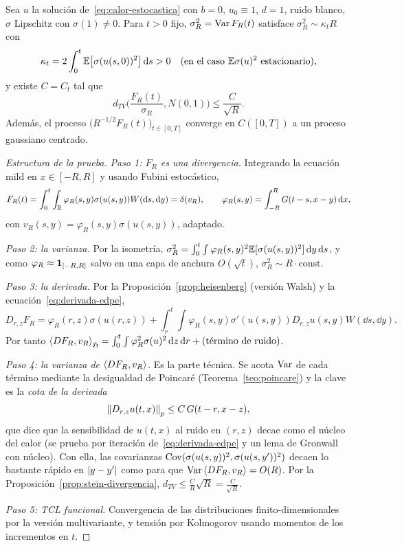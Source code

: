 \begin{teorema}\label{teo:hnv}
Sea $u$ la solución de~\eqref{eq:calor-estocastica} con $b=0$,
$u_0\equiv1$, $d=1$, ruido blanco, $\sigma$ Lipschitz con $\sigma(1)\ne0$. Para $t>0$ fijo, $\sigma_R^2=\operatorname{Var} F_R(t)$
satisface $\sigma_R^2\sim\kappa_tR$ con
\[
  \kappa_t=2\int_0^t\mathbb{E}\big[\sigma(u(s,0))^2\big]\,\mathrm{d} s>0\quad\text{(en el caso }\mathbb{E}\sigma(u)^2\text{ estacionario)},
\]
y existe $C=C_t$ tal que
\[
  d_{TV}\Big(\frac{F_R(t)}{\sigma_R},N(0,1)\Big)\le\frac C{\sqrt R}.
\]
Además, el proceso $\big(R^{-1/2}F_R(t)\big)_{t\in[0,T]}$ converge en $C([0,T])$ a un proceso gaussiano centrado.
\end{teorema}

\begin{proof}[Estructura de la prueba]
\emph{Paso 1: $F_R$ es una divergencia.} Integrando la ecuación mild en
$x\in[-R,R]$ y usando Fubini estocástico,
\[
  F_R(t)=\int_0^t\int_{\mathbb{R}}\varphi_R(s,y)\sigma(u(s,y))W(\mathrm{d} s,\mathrm{d} y)=\delta(v_R),\qquad\varphi_R(s,y)=\int_{-R}^RG(t-s,x-y)\,\mathrm{d} x,
\]
con $v_R(s,y)=\varphi_R(s,y)\sigma(u(s,y))$, adaptado.

\emph{Paso 2: la varianza.} Por la isometría, $\sigma_R^2=\int_0^t\int\varphi_R(s,y)^2\mathbb{E}[\sigma(u(s,y))^2]\,\mathrm{d} y\,\mathrm{d} s$, y como
$\varphi_R\approx\mathbf{1}_{[-R,R]}$ salvo en una capa de anchura $O(\sqrt t)$, $\sigma_R^2\sim R\cdot\text{const}$.

\emph{Paso 3: la derivada.} Por la Proposición~\ref{prop:heisenberg} (versión Walsh) y la ecuación~\eqref{eq:derivada-edpe},
\[
  D_{r,z}F_R=\varphi_R(r,z)\sigma(u(r,z))+\int_r^t\!\!\int\varphi_R(s,y)\sigma'(u(s,y))D_{r,z}u(s,y)W(\dd s,\dd y).
\]
Por tanto $\left\langle DF_R, v_R\right\rangle_{\mathfrak{H}}=\int_0^t\int\varphi_R^2\sigma(u)^2\,\mathrm{d} z\,\mathrm{d} r+\text{(término de ruido)}$.

\emph{Paso 4: la varianza de $\left\langle DF_R, v_R\right\rangle$.} Es la parte técnica. Se acota $\operatorname{Var}$ de cada término
mediante la desigualdad de Poincaré (Teorema~\ref{teo:poincare}) y la clave es la \emph{cota de la derivada}
\[
  \left\lVert D_{r,z}u(t,x)\right\rVert_p\le C\,G(t-r,x-z),
\]
que dice que la sensibilidad de $u(t,x)$ al ruido en $(r,z)$ decae como el núcleo del calor
(se prueba por iteración de~\eqref{eq:derivada-edpe} y un lema de Gronwall con núcleo). Con ella, las covarianzas
$\operatorname{Cov}(\sigma(u(s,y))^2,\sigma(u(s,y'))^2)$ decaen lo bastante rápido en $\left\lvert y-y'\right\rvert$ como para que
$\operatorname{Var}\left\langle DF_R, v_R\right\rangle=O(R)$. Por la Proposición~\ref{prop:stein-divergencia}, $d_{TV}\le\frac CR\sqrt R=\frac C{\sqrt R}$.

\emph{Paso 5: TCL funcional.} Convergencia de las distribuciones finito-dimensionales por la
versión multivariante, y tensión por Kolmogorov usando momentos de los incrementos en $t$.
\end{proof}

